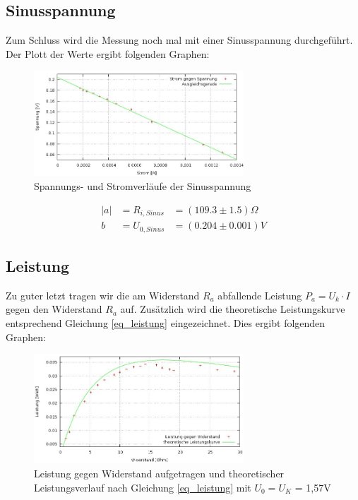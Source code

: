 \subsection{Sinusspannung}
Zum Schluss wird die Messung noch mal mit einer Sinusspannung durchgeführt. Der Plott der Werte ergibt folgenden Graphen:
\begin{figure}[H]
\includegraphics[width=0.7\textwidth]{pics/sinus.jpeg}
\caption{Spannungs- und Stromverläufe der Sinusspannung}
\end{figure}
\begin{align*}
|a| &= R_{i,Sinus}   &= (109.3    \pm 1.5) \Omega\\
b &= U_{0, Sinus} &= (0.204 \pm 0.001) V
\end{align*}

\subsection{Leistung}
Zu guter letzt tragen wir die am Widerstand $R_a$ abfallende Leistung $P_a = U_k \cdot I$ gegen den Widerstand $R_a$ auf. Zusätzlich wird die theoretische Leistungskurve entsprechend Gleichung \ref{eq_leistung} eingezeichnet. Dies ergibt folgenden Graphen:

\begin{figure}[htbp]
\includegraphics[width=0.7\textwidth]{pics/leistung.jpeg}
\caption{Leistung gegen Widerstand aufgetragen und theoretischer Leistungsverlauf nach Gleichung \eqref{eq_leistung} mit $U_0=U_K$ = 1,57V}
\label{pic_leistung}
\end{figure}


